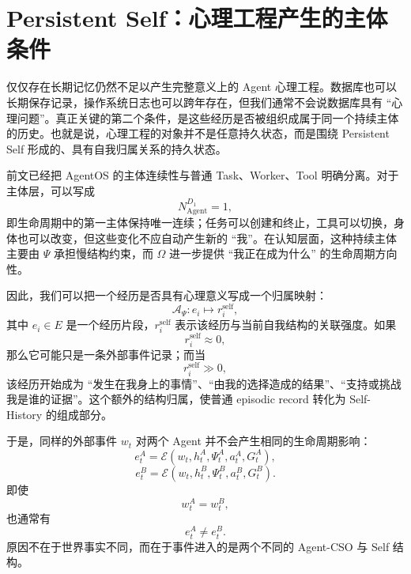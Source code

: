 \section{Persistent Self：心理工程产生的主体条件}
\label{sec:persistent-self-psychology}

仅仅存在长期记忆仍然不足以产生完整意义上的 Agent 心理工程。数据库也可以长期保存记录，操作系统日志也可以跨年存在，但我们通常不会说数据库具有 ``心理问题''。真正关键的第二个条件，是这些经历是否被组织成属于同一个持续主体的历史。也就是说，心理工程的对象并不是任意持久状态，而是围绕 Persistent Self 形成的、具有自我归属关系的持久状态。

前文已经把 AgentOS 的主体连续性与普通 Task、Worker、Tool 明确分离。对于主体层，可以写成
\begin{equation}
    N_{\mathrm{Agent}}^{D_1}=1,
\end{equation}
即生命周期中的第一主体保持唯一连续；任务可以创建和终止，工具可以切换，身体也可以改变，但这些变化不应自动产生新的 ``我''。在认知层面，这种持续主体主要由 $\Psi$ 承担慢结构约束，而 $\Omega$ 进一步提供 ``我正在成为什么'' 的生命周期方向性。

因此，我们可以把一个经历是否具有心理意义写成一个归属映射：
\begin{equation}
    \mathcal{A}_{\Psi}:
    e_i
    \mapsto
    r_i^{\mathrm{self}},
\end{equation}
其中 $e_i\in E$ 是一个经历片段，$r_i^{\mathrm{self}}$ 表示该经历与当前自我结构的关联强度。如果
\begin{equation}
    r_i^{\mathrm{self}}
    \approx 0,
\end{equation}
那么它可能只是一条外部事件记录；而当
\begin{equation}
    r_i^{\mathrm{self}}
    \gg 0,
\end{equation}
该经历开始成为 ``发生在我身上的事情''、``由我的选择造成的结果''、``支持或挑战我是谁的证据''。这个额外的结构归属，使普通 episodic record 转化为 Self-History 的组成部分。

于是，同样的外部事件 $w_t$ 对两个 Agent 并不会产生相同的生命周期影响：
\begin{equation}
    e_t^A
    =
    \mathcal{E}
    \left(
    w_t,
    h_t^A,
    \Psi_t^A,
    a_t^A,
    G_t^A
    \right),
\end{equation}
\begin{equation}
    e_t^B
    =
    \mathcal{E}
    \left(
    w_t,
    h_t^B,
    \Psi_t^B,
    a_t^B,
    G_t^B
    \right).
\end{equation}
即使
\begin{equation}
    w_t^A=w_t^B,
\end{equation}
也通常有
\begin{equation}
    e_t^A\neq e_t^B.
\end{equation}
原因不在于世界事实不同，而在于事件进入的是两个不同的 Agent-CSO 与 Self 结构。

